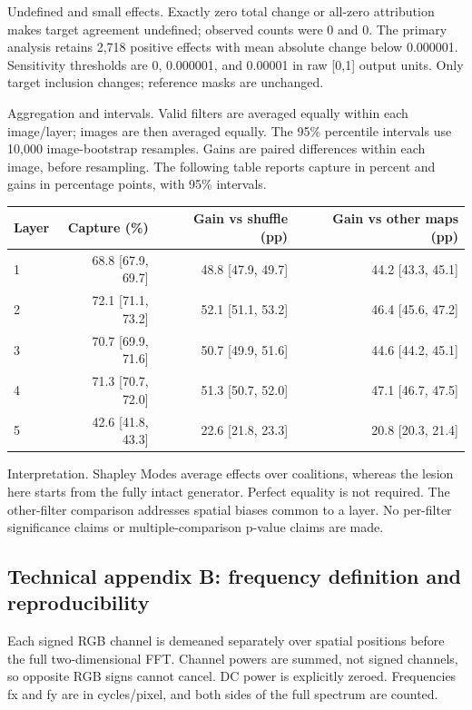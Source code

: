 \documentclass[10pt,a4paper]{article}
\begin{document}
Undefined and small effects. Exactly zero total change or all-zero attribution makes target agreement undefined; observed counts were 0 and 0. The primary analysis retains 2,718 positive effects with mean absolute change below 0.000001. Sensitivity thresholds are 0, 0.000001, and 0.00001 in raw [0,1] output units. Only target inclusion changes; reference masks are unchanged.

Aggregation and intervals. Valid filters are averaged equally within each image/layer; images are then averaged equally. The 95\% percentile intervals use 10,000 image-bootstrap resamples. Gains are paired differences within each image, before resampling. The following table reports capture in percent and gains in percentage points, with 95\% intervals.

\begin{center}{\small\begin{tabular}{lrrr}\toprule
Layer & Capture (\%) & Gain vs shuffle (pp) & Gain vs other maps (pp) \\ \midrule
1 & 68.8 [67.9, 69.7] & 48.8 [47.9, 49.7] & 44.2 [43.3, 45.1] \\
2 & 72.1 [71.1, 73.2] & 52.1 [51.1, 53.2] & 46.4 [45.6, 47.2] \\
3 & 70.7 [69.9, 71.6] & 50.7 [49.9, 51.6] & 44.6 [44.2, 45.1] \\
4 & 71.3 [70.7, 72.0] & 51.3 [50.7, 52.0] & 47.1 [46.7, 47.5] \\
5 & 42.6 [41.8, 43.3] & 22.6 [21.8, 23.3] & 20.8 [20.3, 21.4] \\
\bottomrule\end{tabular}}\end{center}
Interpretation. Shapley Modes average effects over coalitions, whereas the lesion here starts from the fully intact generator. Perfect equality is not required. The other-filter comparison addresses spatial biases common to a layer. No per-filter significance claims or multiple-comparison p-value claims are made.

\newpage
\subsection*{Technical appendix B: frequency definition and reproducibility}
Each signed RGB channel is demeaned separately over spatial positions before the full two-dimensional FFT. Channel powers are summed, not signed channels, so opposite RGB signs cannot cancel. DC power is explicitly zeroed. Frequencies fx and fy are in cycles/pixel, and both sides of the full spectrum are counted.
\end{document}
